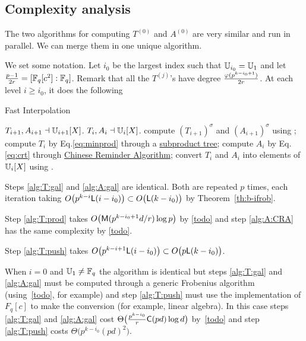 \subsection{Complexity analysis}
\label{sec:C2-AS-FI:complexity}

The two algorithms for computing $T^{(0)}$ and $A^{(0)}$ are very
similar and run in parallel. We can merge them in one unique
algorithm.

We set some notation. Let $i_0$ be the largest index such that
$\mathbb{U}_{i_0} = \mathbb{U}_1$ and let $\frac{p-1}{2r} = [\mathbb{F}_q[c^2]:\mathbb{F}_q]$.  Remark
that all the $T^{(j)}$'s have degree $\frac{\varphi(p^{k-i_0+1})}{2r}$.
At each level $i\ge i_0$, it does the following

\begin{algorithm}
  \caption{Fast Interpolation}
  \begin{algorithmic}[1]
    \REQUIRE $T_{i+1},A_{i+1}\dashv\mathbb{U}_{i+1}[X]$.
    \ENSURE $T_i,A_i\dashv\mathbb{U}_i[X]$.
    \STATE\label{alg:T:gal} compute $\left(T_{i+1}\right)^\sigma$ and
    \STATE\label{alg:A:gal} $\left(A_{i+1}\right)^\sigma$ using ;
    \ENDFOR
    \STATE\label{alg:T:prod} compute $T_i$ by Eq.\eqref{eq:minprod}
    through a \hyperref[todo]{subproduct tree};
    \STATE\label{alg:A:CRA} compute $A_i$ by Eq.\eqref{eq:crt} through
    \hyperref[todo]{Chinese Reminder Algorithm};
    \STATE\label{alg:T:push} convert $T_i$ and $A_i$ into
    elements of $\mathbb{U}_i[X]$ using .
  \end{algorithmic}
\end{algorithm}

Steps \ref{alg:T:gal} and \ref{alg:A:gal} are identical. Both are
repeated $p$ times, each iteration taking $O\bigl(p^{k-i}{\sf
  L}(i-i_0)\bigr) \subset O\bigl({\sf L}(k-i_0)\bigr)$ by
Theorem~\ref{th:b-ifrob}.

Step \ref{alg:T:prod} takes $O\bigl(\mathsf{M}(p^{k-i_0+1}d/r)\log p\bigr)$
by \ref{todo} and step \ref{alg:A:CRA} has the same
complexity by \ref{todo}.

Step \ref{alg:T:push} takes $O\bigl(p^{k-i+1}{\sf L}(i-i_0)\bigr)
\subset O\bigl(p{\sf L}(k-i_0)\bigr)$.

When $i=0$ and $\mathbb{U}_1\ne\mathbb{F}_q$ the algorithm is identical but steps
\ref{alg:T:gal} and \ref{alg:A:gal} must be computed through a generic
Frobenius algorithm (using~\ref{todo}, for example) and step
\ref{alg:T:push} must use the implementation of $F_q[c]$ to make the
conversion (for example, linear algebra). In this case steps
\ref{alg:T:gal} and \ref{alg:A:gal} cost
$\Theta\bigl(\frac{p^{k-i_0}}{r}\mathsf{C}(pd)\log d \bigr)$
by~\ref{todo} and step \ref{alg:T:push} costs
$\Theta\bigl(p^{k-i_0}(pd)^2\bigr)$.

